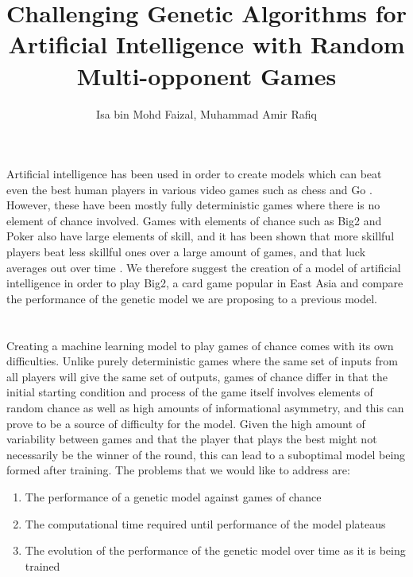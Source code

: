 \documentclass[]{article}
\title{Challenging Genetic Algorithms for Artificial Intelligence with Random Multi-opponent Games }
\author{Isa bin Mohd Faizal, Muhammad Amir Rafiq}
\begin{document}
\maketitle

\section*{}
Artificial intelligence has been used in order to create models which can beat even the best human players in various video games such as chess and Go \cite{chessai} \cite{goai}. However, these have been mostly fully deterministic games where there is no element of chance involved. Games with elements of chance such as Big2 and Poker also have large elements of skill, and it has been shown that more skillful players beat less skillful ones over a large amount of games, and that luck averages out over time \cite{pokerluck}. We therefore suggest the creation of a model of artificial intelligence in order to play Big2, a card game popular in East Asia and compare the performance of the genetic model we are proposing to a previous model.

\section*{}

Creating a machine learning model to play games of chance comes with its own difficulties. Unlike purely deterministic games where the same set of inputs from all players will give the same set of outputs, games of chance differ in that the initial starting condition and process of the game itself involves elements of random chance as well as high amounts of informational asymmetry, and this can prove to be a source of difficulty for the model. \cite{pokerai} Given the high amount of variability between games and that the player that plays the best might not necessarily be the winner of the round, this can lead to a suboptimal model being formed after training. The problems that we would like to address are:

\begin{enumerate}
	\item The performance of a genetic model against games of chance
	\item The computational time required until performance of the model plateaus
	\item The evolution of the performance of the genetic model over time as it is being trained
\end{enumerate}
\end{document}

